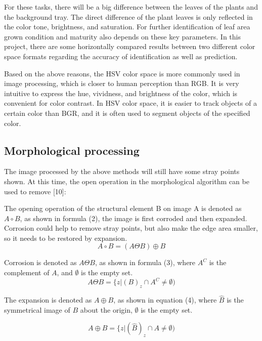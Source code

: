 \documentclass[conference]{IEEEtran}
\begin{document}
For these tasks, there will be a big difference between the leaves of the plants and the background tray. The direct difference of the plant leaves is only reflected in the color tone, brightness, and saturation. For further identification of leaf area grown condition and maturity also depends on these key parameters. In this project, there are some horizontally compared results between two different color space formats regarding the accuracy of identification as well as prediction.

Based on the above reasons, the HSV color space is more commonly used in image processing, which is closer to human perception than RGB. It is very intuitive to express the hue, vividness, and brightness of the color, which is convenient for color contrast. In HSV color space, it is easier to track objects of a certain color than BGR, and it is often used to segment objects of the specified color.


\subsection{Morphological processing}
The image processed by the above methods will still have some stray points shown. At this time, the open operation in the morphological algorithm can be used to remove [10]:
	
The opening operation of the structural element B on image A is denoted as $A \circ B$, as shown in formula (2), the image is first corroded and then expanded. Corrosion could help to remove stray points, but also make the edge area smaller, so it needs to be restored by expansion.
\begin{equation}
A \circ B = ( A \Theta B ) \oplus B
\end{equation}

Corrosion is denoted as $A\Theta B$, as shown in formula (3), where $A^{C}$ is the complement of $A$, and $\emptyset$ is the empty set.
\begin{equation}
A\Theta B = \{ z | {(B)}_{z} \cap A^{C} \neq \emptyset) 
\end{equation}

The expansion is denoted as $A\oplus B$, as shown in equation (4), 
where $\hat{B}$ is the symmetrical image of $B$ about the origin, $\emptyset$ is the empty set.

\begin{equation}
A\oplus B = \{ z | {(\hat{B})}_{z} \cap A \neq \emptyset) 
\end{equation}
\end{document}
